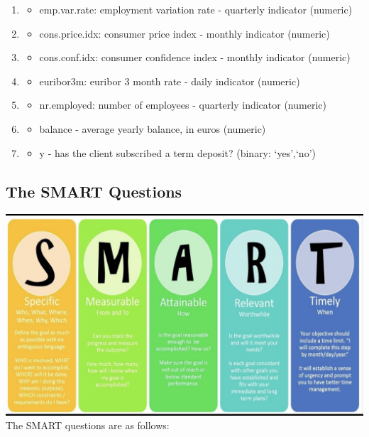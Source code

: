 \documentclass[
  letterpaper,
  DIV=11,
  numbers=noendperiod]{scrartcl}
\providecommand{\tightlist}{%
  \setlength{\itemsep}{0pt}\setlength{\parskip}{0pt}}\usepackage{longtable,booktabs,array}
\begin{document}
\begin{enumerate}
\begin{itemize}
  \end{itemize}
\item
  \begin{itemize}
  \tightlist
  \item
    emp.var.rate: employment variation rate - quarterly indicator
    (numeric)
  \end{itemize}
\item
  \begin{itemize}
  \tightlist
  \item
    cons.price.idx: consumer price index - monthly indicator (numeric)
  \end{itemize}
\item
  \begin{itemize}
  \tightlist
  \item
    cons.conf.idx: consumer confidence index - monthly indicator
    (numeric)
  \end{itemize}
\item
  \begin{itemize}
  \tightlist
  \item
    euribor3m: euribor 3 month rate - daily indicator (numeric)
  \end{itemize}
\item
  \begin{itemize}
  \tightlist
  \item
    nr.employed: number of employees - quarterly indicator (numeric)
  \end{itemize}
\item
  \begin{itemize}
  \tightlist
  \item
    balance - average yearly balance, in euros (numeric)
  \end{itemize}
\item
  \begin{itemize}
  \tightlist
  \item
    y - has the client subscribed a term deposit? (binary: `yes',`no')
  \end{itemize}
\end{enumerate}

\hypertarget{the-smart-questions}{%
\subsection{The SMART Questions}\label{the-smart-questions}}

\includegraphics{maxresdefault.jpg} The SMART questions are as follows:
\end{document}
